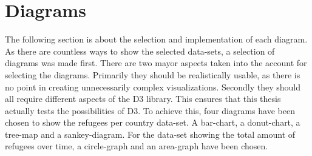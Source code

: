 




\section{Diagrams}

The following section is about the selection and implementation of each diagram. As there are countless ways to show the selected data-sets, a selection of diagrams was made first. There are two mayor aspects taken into the account for selecting the diagrams. Primarily they should be realistically usable, as there is no point in creating unnecessarily complex visualizations. Secondly they should all require different aspects of the D3 library. This ensures that this thesis actually tests the possibilities of D3. To achieve this, four diagrams have been chosen to show the refugees per country data-set. A bar-chart, a donut-chart, a tree-map and a sankey-diagram. For the data-set showing the total amount of refugees over time, a circle-graph and an area-graph have been chosen.

